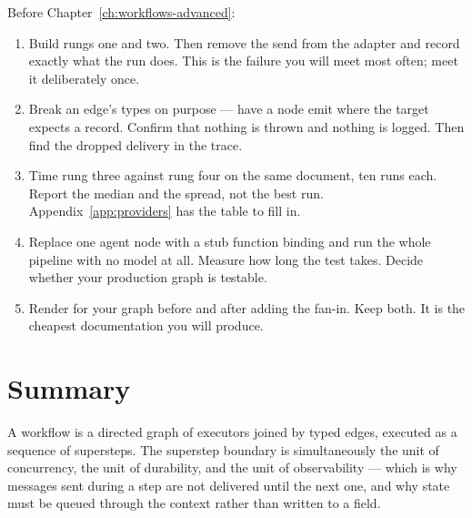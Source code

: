 
\begin{exercisebox}
Before Chapter~\ref{ch:workflows-advanced}:

\begin{enumerate}[leftmargin=1.4em]
\item Build rungs one and two. Then remove the  send from the
      adapter and record exactly what the run does. This is the failure you will
      meet most often; meet it deliberately once.
\item Break an edge's types on purpose --- have a node emit  where
      the target expects a record. Confirm that nothing is thrown and nothing is
      logged. Then find the dropped delivery in the trace.
\item Time rung three against rung four on the same document, ten runs each.
      Report the median and the spread, not the best run. Appendix~\ref{app:providers}
      has the table to fill in.
\item Replace one agent node with a stub function binding and run the whole
      pipeline with no model at all. Measure how long the test takes. Decide
      whether your production graph is testable.
\item Render  for your graph before and after adding the
      fan-in. Keep both. It is the cheapest documentation you will produce.
\end{enumerate}
\end{exercisebox}

\section{Summary}

A workflow is a directed graph of executors joined by typed edges, executed as a
sequence of supersteps. The superstep boundary is simultaneously the unit of
concurrency, the unit of durability, and the unit of observability --- which is
why messages sent during a step are not delivered until the next one, and why
state must be queued through the context rather than written to a field.

